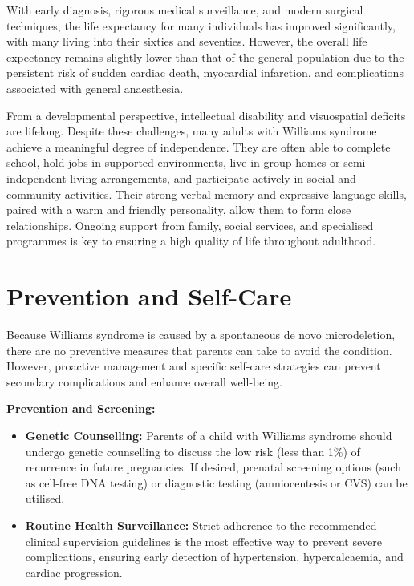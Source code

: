 With early diagnosis, rigorous medical surveillance, and modern surgical techniques, the life expectancy for many individuals has improved significantly, with many living into their sixties and seventies. However, the overall life expectancy remains slightly lower than that of the general population due to the persistent risk of sudden cardiac death, myocardial infarction, and complications associated with general anaesthesia.

From a developmental perspective, intellectual disability and visuospatial deficits are lifelong. Despite these challenges, many adults with Williams syndrome achieve a meaningful degree of independence. They are often able to complete school, hold jobs in supported environments, live in group homes or semi-independent living arrangements, and participate actively in social and community activities. Their strong verbal memory and expressive language skills, paired with a warm and friendly personality, allow them to form close relationships. Ongoing support from family, social services, and specialised programmes is key to ensuring a high quality of life throughout adulthood.

\section*{Prevention and Self-Care}
Because Williams syndrome is caused by a spontaneous de novo microdeletion, there are no preventive measures that parents can take to avoid the condition. However, proactive management and specific self-care strategies can prevent secondary complications and enhance overall well-being.

\textbf{Prevention and Screening:}
\begin{itemize}
    \item \textbf{Genetic Counselling:} Parents of a child with Williams syndrome should undergo genetic counselling to discuss the low risk (less than 1\%) of recurrence in future pregnancies. If desired, prenatal screening options (such as cell-free DNA testing) or diagnostic testing (amniocentesis or CVS) can be utilised.
    \item \textbf{Routine Health Surveillance:} Strict adherence to the recommended clinical supervision guidelines is the most effective way to prevent severe complications, ensuring early detection of hypertension, hypercalcaemia, and cardiac progression.
\end{itemize}

